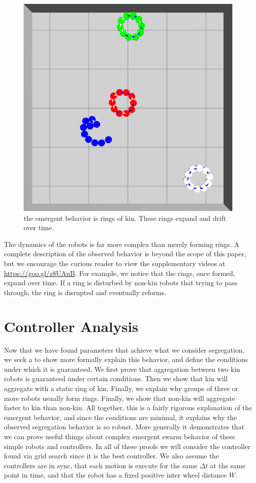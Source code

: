 \documentclass[conference]{IEEEtran}
\begin{document}
    \begin{figure}
      \centering
      \includegraphics[width=0.7\linewidth]{./images/rings_example.png}
      \caption{the emergent behavior is rings of kin. These rings expand and drift over time.}
      \label{fig:rings}
    \end{figure}

    The dynamics of the robots is far more complex than merely forming rings. A complete description of the observed behavior is beyond the scope of this paper, but we encourage the curious reader to view the supplementary videos at \href{https://www.youtube.com/playlist?list=PL9HqYJ1IkIKVX9EsT5BY9LnBsBPTjc5bB}{https://goo.gl/z8UAuB}. For example, we notice that the rings, once formed, expand over time. If a ring is disturbed by non-kin robots that trying to pass through, the ring is disrupted and eventually reforms.

\section{Controller Analysis}

  Now that we have found parameters that achieve what we consider segregation, we seek a to show more formally explain this behavior, and define the conditions under which it is guaranteed. We first prove that aggregation between two kin robots is guaranteed under certain conditions. Then we show that kin will aggregate with a static ring of kin. Finally, we explain why groups of three or more robots usually form rings. Finally, we show that non-kin will aggregate faster to kin than non-kin. All together, this is a fairly rigorous explanation of the emergent behavior, and since the conditions are minimal, it explains why the observed segregation behavior is so robust. More generally it demonstrates that we can prove useful things about complex emergent swarm behavior of these simple robots and controllers. In all of these proofs we will consider the controller found via grid search since it is the best controller. We also assume the controllers are in sync, that each motion is execute for the same $\Delta t$ at the same point in time, and that the robot has a fixed positive inter wheel distance $W$.
\end{document}
